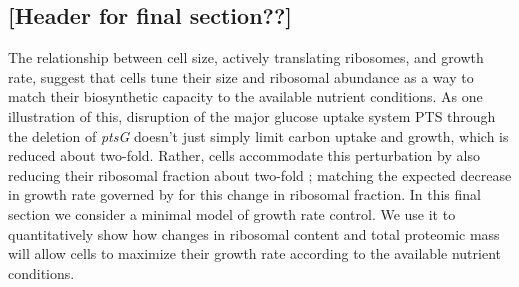



\subsection{[Header for final section??]}

The relationship between cell size, actively translating ribosomes, and growth
rate, suggest that cells tune their size and ribosomal abundance as a way to
match their biosynthetic capacity to the available nutrient conditions. As one
illustration of this, disruption of the major glucose uptake system PTS through
the deletion of \textit{ptsG} doesn't just simply limit carbon uptake and
growth, which is reduced about two-fold. Rather, cells accommodate this
perturbation by also reducing their ribosomal fraction about two-fold
\citep{dai2016}; matching the expected decrease in growth rate governed by
 for this change in ribosomal fraction. In
this final section we consider a minimal model of growth rate control. We use it
to quantitatively show how changes in ribosomal content and total proteomic mass
will allow cells to maximize their growth rate according to the available
nutrient conditions.

